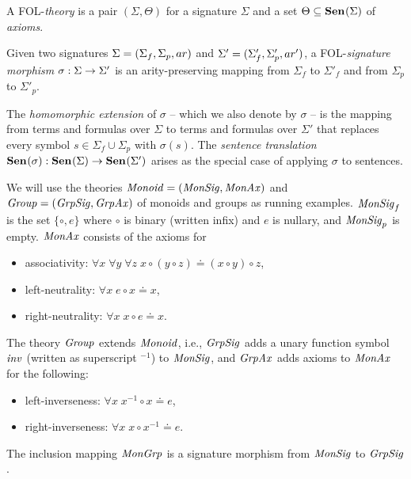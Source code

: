 \documentclass{article}
\begin{document}
\begin{definition}[Theories]\label{def:thy}
A FOL-\emph{theory} is a pair $(\Sigma,\Theta)$ for a signature $\Sigma$ and a set $\Theta \subseteq {\mathbf{Sen}^{}}(\Sigma)$ of \emph{axioms}.
\end{definition}

\begin{definition}
Given two signatures $\Sigma=(\Sigma_f,\Sigma_p,ar)$ and $\Sigma'=(\Sigma'_f,\Sigma'_p,ar')$, a FOL-\emph{signature morphism} $\sigma:\Sigma\rightarrow\Sigma'$ is an arity-preserving mapping from $\Sigma_f$ to $\Sigma'_f$ and from $\Sigma_p$ to $\Sigma'_p$.

The \emph{homomorphic extension} of $\sigma$ -- which we also denote by $\sigma$ -- is the mapping from terms and formulas over $\Sigma$ to terms and formulas over $\Sigma'$ that replaces every symbol $s\in\Sigma_f\cup\Sigma_p$ with $\sigma(s)$. The \emph{sentence translation}\linebreak ${\mathbf{Sen}^{}}(\sigma):{\mathbf{Sen}^{}}(\Sigma)\rightarrow{\mathbf{Sen}^{}}(\Sigma')$ arises as the special case of applying $\sigma$ to sentences.
\end{definition}

\begin{example}\label{ex:mongr}
We will use the theories $\monoid = (\Monsig,\linebreak \Monax)$ and $\mathit{Group}=(\mathit{GrpSig},\mathit{GrpAx})$ of monoids and groups as running examples. $\mathit{MonSig}_f$ is the set $\{\circ,e\}$ where $\circ$ is binary (written infix) and $e$ is nullary, and $\mathit{MonSig}_p$ is empty. $\mathit{MonAx}$ consists of the axioms for
\begin{itemize}
\item associativity: $\forall x\;\forall y\;\forall z\;x\circ (y\circ z) \doteq (x\circ y)\circ z$,
\item left-neutrality: $\forall x\;e\circ x \doteq x$,
\item right-neutrality: $\forall x\;x\circ e \doteq x$.
\end{itemize}
The theory $\mathit{Group}$ extends $\mathit{Monoid}$, i.e., $\mathit{GrpSig}$ adds a unary function symbol $\mathit{inv}$ (written as superscript $^{-1}$) to $\mathit{MonSig}$, and $\mathit{GrpAx}$ adds axioms to $\mathit{MonAx}$ for the following:
\begin{itemize}
\item left-inverseness: $\forall x\;x^{-1}\circ x \doteq e$, 
\item right-inverseness: $\forall x\;x\circ x^{-1} \doteq e$.
\end{itemize}

The inclusion mapping $\mathit{MonGrp}$ is a signature morphism from $\mathit{MonSig}$ to $\mathit{GrpSig}$. 
\end{example}
\end{document}
